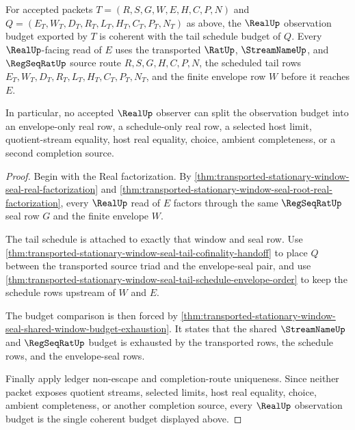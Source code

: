 \begin{theorem}
\label{thm:transported-stationary-window-seal-real-observation-budget-coherence}
For accepted packets $T=(R,S,G,W,E,H,C,P,N)$ and $Q=(E_T,W_T,D_T,R_T,L_T,H_T,C_T,P_T,N_T)$ as above, the $\RealUp$ observation budget exported by $T$ is coherent with the tail schedule budget of $Q$. Every $\RealUp$-facing read of $E$ uses the transported $\RatUp$, $\StreamNameUp$, and $\RegSeqRatUp$ source route $R,S,G,H,C,P,N$, the scheduled tail rows $E_T,W_T,D_T,R_T,L_T,H_T,C_T,P_T,N_T$, and the finite envelope row $W$ before it reaches $E$.

In particular, no accepted $\RealUp$ observer can split the observation budget into an envelope-only real row, a schedule-only real row, a selected host limit, quotient-stream equality, host real equality, choice, ambient completeness, or a second completion source.
\end{theorem}
\begin{proof}
Begin with the Real factorization. By \autoref{thm:transported-stationary-window-seal-real-factorization} and \autoref{thm:transported-stationary-window-seal-root-real-factorization}, every $\RealUp$ read of $E$ factors through the same $\RegSeqRatUp$ seal row $G$ and the finite envelope $W$.

The tail schedule is attached to exactly that window and seal row. Use \autoref{thm:transported-stationary-window-seal-tail-cofinality-handoff} to place $Q$ between the transported source triad and the envelope-seal pair, and use \autoref{thm:transported-stationary-window-seal-tail-schedule-envelope-order} to keep the schedule rows upstream of $W$ and $E$.

The budget comparison is then forced by \autoref{thm:transported-stationary-window-seal-shared-window-budget-exhaustion}. It states that the shared $\StreamNameUp$ and $\RegSeqRatUp$ budget is exhausted by the transported rows, the schedule rows, and the envelope-seal rows.

Finally apply ledger non-escape and completion-route uniqueness. Since neither packet exposes quotient streams, selected limits, host real equality, choice, ambient completeness, or another completion source, every $\RealUp$ observation budget is the single coherent budget displayed above.
\end{proof}

